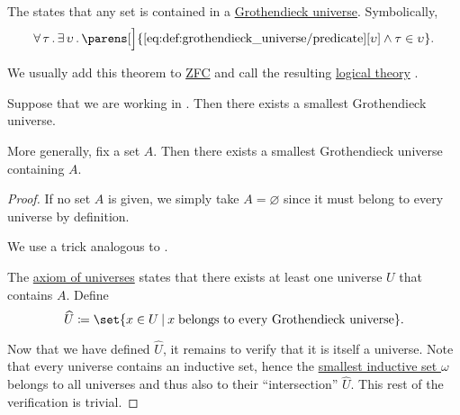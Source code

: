 \begin{definition}\label{def:axiom_of_universes}
  The  states that any set is contained in a \hyperref[def:grothendieck_universe]{Grothendieck universe}. Symbolically,
  \begin{equation}\label{eq:def:axiom_of_universes}
    \begin{aligned}
      \qforall \tau \qexists \upsilon \parens[\Big]{ \ref{eq:def:grothendieck_universe/predicate}[\upsilon] \wedge \tau \in \upsilon }.
    \end{aligned}
  \end{equation}

  We usually add this theorem to \hyperref[def:zfc]{ZFC} and call the resulting \hyperref[def:first_order_theory]{logical theory} .
\end{definition}

\begin{proposition}\label{thm:smallest_grothendieck_universe_existence}
  Suppose that we are working in . Then there exists a smallest Grothendieck universe.

  More generally, fix a set \( A \). Then there exists a smallest Grothendieck universe containing \( A \).
\end{proposition}
\begin{proof}
  If no set \( A \) is given, we simply take \( A = \varnothing \) since it must belong to every universe by definition.

  We use a trick analogous to .

  The \hyperref[def:axiom_of_universes]{axiom of universes} states that there exists at least one universe \( U \) that contains \( A \). Define
  \begin{equation*}
    \widehat U \coloneqq \set{ x \in U \given x \T{belongs to every Grothendieck universe} }.
  \end{equation*}

  Now that we have defined \( \widehat U \), it remains to verify that it is itself a universe. Note that every universe contains an inductive set, hence the \hyperref[thm:smallest_inductive_set_existence]{smallest inductive set \( \omega \)} belongs to all universes and thus also to their \enquote{intersection} \( \widehat U \). This rest of the verification is trivial.
\end{proof}


